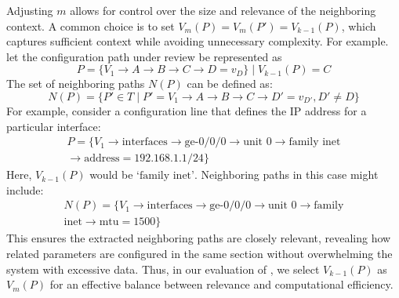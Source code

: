 Adjusting \( m \) allows for control over the size and relevance of the neighboring context.
A common choice is to set \(V_m(P) = V_m(P') = V_{k-1}(P) \),  which captures sufficient context while avoiding unnecessary complexity. For example. let the configuration path under review be represented as
\[
P = \{V_1 \rightarrow A \rightarrow B \rightarrow C \rightarrow D = v_D \} \mid V_{k-1}(P) = C
\]
The set of neighboring paths \( N(P) \) can be defined as:
\[
N(P) = \{ P' \in T \mid P' = V_1 \rightarrow A \rightarrow B \rightarrow C \rightarrow D' = v_{D'}, D' \neq D \}
\]
For example, consider a configuration line that defines the IP address for a particular interface:
\begin{multline*}
P = \{V_1 \rightarrow \text{interfaces} \rightarrow \text{ge-0/0/0} 
\rightarrow \text{unit 0} \rightarrow \text{family inet}\\
\rightarrow \text{address} = 192.168.1.1/24 \}
\end{multline*}
Here, \(V_{k-1}(P)\) would be \( \text{`family inet'} \). Neighboring paths in this case might include:
\begin{multline*}
N(P) = \{V_1 \rightarrow \text{interfaces} \rightarrow \text{ge-0/0/0}
\rightarrow \text{unit 0} \rightarrow
\text{family}\\ \text{inet} \rightarrow \text{mtu} = 1500 \}
\end{multline*}
This ensures the extracted neighboring paths are closely relevant, revealing how related parameters are configured in the same section without overwhelming the system with excessive data. Thus, in our evaluation of \sysname{}, we select \(V_{k-1}(P)\) as  \( V_m(P) \) for an effective balance between relevance and computational efficiency.

